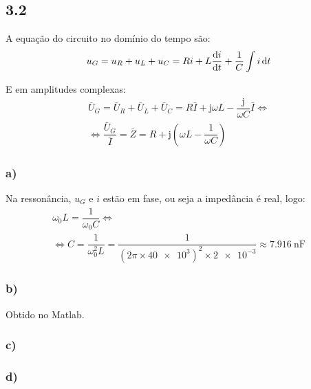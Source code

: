 \documentclass[a4paper, titlepage, portuguese]{article}
\newcommand{\eq}{\Leftrightarrow} %
\begin{document}
	\subsection{3.2}
		\par
		A equação do circuito no domínio do tempo são:
		\begin{gather*}
			u_G = u_R + u_L + u_C = Ri + L\dv{i}{t} + \dfrac{1}{C} \int{i\dd{t}}
		\end{gather*}

		\par
		E em amplitudes complexas:
		\begin{gather*}
			\bar{U}_G = \bar{U}_R + \bar{U}_L + \bar{U}_C = R\bar{I} + \mathrm{j} \omega L - \dfrac{\mathrm{j}}{\omega C}\bar{I} \eq \\
			\eq \dfrac{\bar{U}_G}{\bar{I}} = \bar{Z} = R + \mathrm{j}(\omega L - \dfrac{1}{\omega C})
		\end{gather*}

	\subsubsection{a)}
		\par
		Na ressonância, $u_G$ e $i$ estão em fase, ou seja a impedância é real, logo:
		\begin{gather*}
			\omega_0 L = \dfrac{1}{\omega_0 C} \eq \\
			\eq C = \dfrac{1}{\omega_0^2 L} = \dfrac{1}{(2\pi \times \num{40e3})^2 \times \num{2e-3}} \approx \SI{7.916}{\nano\farad}
		\end{gather*}

	\subsubsection{b)}
		\par
		Obtido no Matlab.

	\subsubsection{c)}

	\subsubsection{d)}



\end{document}
